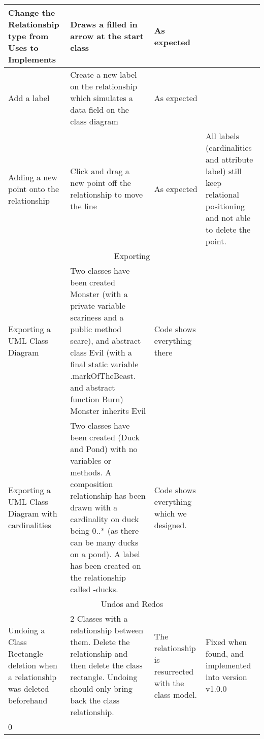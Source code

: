 \begin{landscape}
\begin{tabular}{| p{3cm} | p{7cm} | p{7cm} | p{8cm} |}
	Change the Relationship type from Uses to Implements  & Draws a filled in arrow at the start class & As expected & \\ \hline

	Add a label & Create a new label on the relationship which simulates a data field on the class diagram & As expected & \\ \hline

	Adding a new point onto the relationship & Click and drag a new point off the relationship to move the line & As expected & All labels (cardinalities and attribute label) still keep relational positioning and not able to delete the point. \\ \hline

	\multicolumn{4}{|c|}{Exporting} \\ \hline
	Exporting a UML Class Diagram & Two classes have been created Monster (with a private variable scariness and a public method scare), and abstract class Evil (with a final static variable .markOfTheBeast. and abstract function Burn) Monster inherits Evil & Code shows everything there & \\ \hline

	Exporting a UML Class Diagram with cardinalities & Two classes have been created (Duck and Pond) with no variables or methods. A composition relationship has been drawn with a cardinality on duck being 0..* (as there can be many ducks on a pond). A label has been created on the relationship called -ducks. & Code shows everything which we designed. & \\ \hline

	\multicolumn{4}{|c|}{Undos and Redos} \\ \hline
	
	Undoing a Class Rectangle deletion when a relationship was deleted beforehand & 2 Classes with a relationship between them. Delete the relationship and then delete the class rectangle. Undoing should only bring back the class relationship. & The relationship is resurrected with the class model. & Fixed when found, and implemented into version v1.0.0 \\ \hline0



\end{tabular}

 \end{landscape}
\newpage




